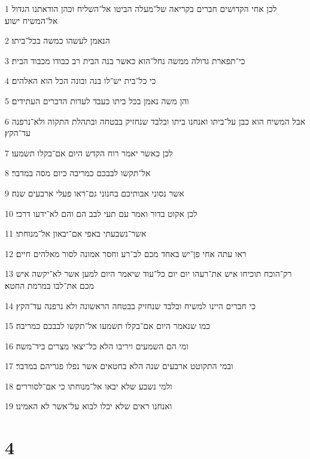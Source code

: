 \par 1 לכן אחי הקדושים חברים בקריאה של־מעלה הביטו אל־השליח וכהן הודאתנו הגדול אל־המשיח ישוע׃
\par 2 הנאמן לעשהו כמשה בכל־ביתו׃
\par 3 כי־תפארת גדולה ממשה נחל־הוא כאשר בנה הבית רב כבודו מכבוד הבית׃
\par 4 כי כל־בית יש־לו בנה ובונה הכל הוא האלהים׃
\par 5 והן משה נאמן בכל ביתו כעבד לעדות הדברים העתידים׃
\par 6 אבל המשיח הוא כבן על־ביתו ואנחנו ביתו ובלבד שנחזיק בבטחה ובתהלת התקוה ולא־נרפנה עד־הקץ׃
\par 7 לכן כאשר יאמר רוח הקדש היום אם־בקלו תשמעו׃
\par 8 אל־תקשו לבבכם כמריבה כיום מסה במדבר׃
\par 9 אשר נסוני אבותיכם בחנוני גם־ראו פעלי ארבעים שנה׃
\par 10 לכן אקוט בדור ואמר עם תעי לבב הם והם לא־ידעו דרכי׃
\par 11 אשר־נשבעתי באפי אם־יבאון אל־מנוחתי׃
\par 12 ראו עתה אחי פן־יש באחד מכם לב־רע וחסר אמונה לסור מאלהים חיים׃
\par 13 רק־הוכח תוכיחו איש את־רעהו יום יום כל־עוד שיאמר היום למען אשר לא־יקשה איש מכם את־לבו במרמת החטא׃
\par 14 כי חברים היינו למשיח ובלבד שנחזיק בבטחה הראשונה ולא נרפנה עד־הקץ׃
\par 15 כמו שנאמר היום אם־בקלו תשמעו אל־תקשו לבבכם כמריבה׃
\par 16 ומי הם השמעים ויריבו הלא כל־יצאי מצרים ביד־משה׃
\par 17 ובמי התקוטט ארבעים שנה הלא בחטאים אשר נפלו פגריהם במדבר׃
\par 18 ולמי נשבע שלא יבאו אל־מנוחתו כי אם־לסוררים׃
\par 19 ואנחנו ראים שלא יכלו לבוא על־אשר לא האמינו׃

\chapter{4}

